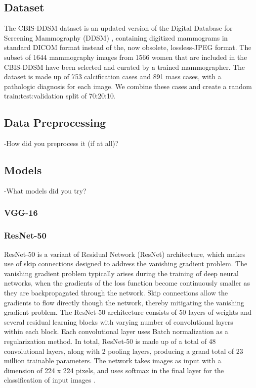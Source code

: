 \documentclass[sn-mathphys,Numbered]{sn-jnl}%
\theoremstyle{thmstyleone}%
\theoremstyle{thmstyletwo}%
\theoremstyle{thmstylethree}%
\begin{document}
\subsection{Dataset}\label{Dataset}
The CBIS-DDSM dataset \cite{Lee2017-hi} is an updated version of the Digital Database for Screening Mammography (DDSM) \cite{Heath2007THEDD}, containing digitized mammograms  in standard DICOM format instead of the, now obsolete, lossless-JPEG format. The subset of 1644 mammography images from 1566 women that are included in the CBIS-DDSM have been selected and curated by a trained mammographer. The dataset is made up of 753 calcification cases and 891 mass cases, with a pathologic diagnosis for each image. We combine these cases and create a random train:test:validation split of 70:20:10.

\subsection{Data Preprocessing}\label{Preprocessing}
-How did you preprocess it (if at all)?

\subsection{Models}\label{Models}
-What models did you try?
\subsubsection{VGG-16}\label{VGG-16}
\subsubsection{ResNet-50}\label{ResNet}
ResNet-50 is a variant of Residual Network (ResNet) architecture, which makes use of skip connections designed to address the vanishing gradient problem. The vanishing gradient problem typically arises during the training of deep neural networks, when the gradients of the loss function become continuously smaller as they are backpropagated through the network. Skip connections allow the gradients  to flow directly though the network, thereby mitigating the vanishing gradient problem. The ResNet-50 architecture consists of 50 layers of weights and several residual learning blocks with varying number of convolutional layers within each block. Each convolutional layer uses Batch normalization as a regularization method. In total, ResNet-50 is made up of a total of  48 convolutional layers, along with 2 pooling layers, producing a grand total of 23 million trainable parameters. The network takes images as input with a dimension of 224 x 224 pixels, and uses softmax in the final layer for the classification of input images \cite{he2015deep}.
\end{document}
